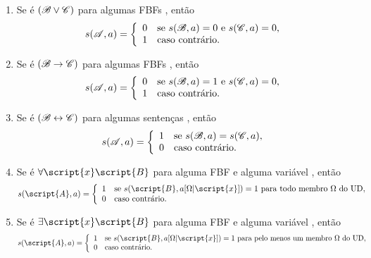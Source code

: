 \begin{enumerate}
\item Se  é $(\mathscr{B}\vee\mathscr{C})$ para algumas FBFs , então
\begin{displaymath}s(\mathscr{A}, a) =
	\left\{\begin{array}{ll}
	0 & \mbox{se $s(\mathscr{B}, a) = 0$  e $s(\mathscr{C}, a) = 0$,}\\
	1 & \mbox{caso contrário.}
	\end{array}\right.
\end{displaymath}

\item Se  é $(\mathscr{B}\rightarrow\mathscr{C})$ para algumas FBFs , então
\begin{displaymath}s(\mathscr{A}, a) =
	\left\{\begin{array}{ll}
	0 & \mbox{se $s(\mathscr{B}, a) = 1$ e $s(\mathscr{C}, a) = 0$,}\\
	1 & \mbox{caso contrário.}
	\end{array}\right.
\end{displaymath}

\item Se  é $(\mathscr{B}\leftrightarrow\mathscr{C})$ para algumas sentenças , então
\begin{displaymath}s(\mathscr{A}, a) =
	\left\{\begin{array}{ll}
	1 & \mbox{se $s(\mathscr{B}, a) = s(\mathscr{C}, a)$},\\
	0 & \mbox{caso contrário.}
	\end{array}\right.
\end{displaymath}

\item Se  é $\forall\script{x} \script{B}$ para alguma FBF  e alguma variável , então
\begin{displaymath}s(\script{A}, a) =
	\left\{\begin{array}{ll}
	1 & \mbox{se $s(\script{B}, a[\Omega|\script{x}])=1$ para todo membro $\Omega$ do UD},\\
	0 & \mbox{caso contrário.}
	\end{array}\right.
\end{displaymath}

\item Se  é $\exists\script{x} \script{B}$ para alguma FBF  e alguma variável , então
\begin{displaymath}s(\script{A}, a) =
	\left\{\begin{array}{ll}
	1 & \mbox{se $s(\script{B}, a[\Omega|\script{x}])=1$ para pelo menos um membro $\Omega$ do UD},\\
	0 & \mbox{caso contrário.}
	\end{array}\right.
\end{displaymath}
\end{enumerate}
 
